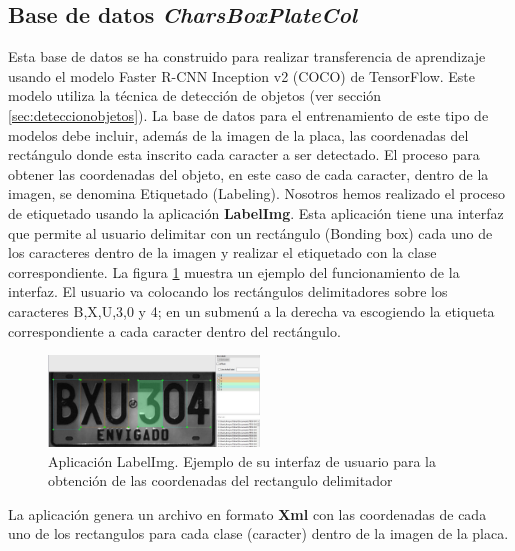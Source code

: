 \subsection{Base de datos \textit{CharsBoxPlateCol}} \label{sec:basedatos3}
Esta base de datos se ha construido para realizar transferencia de aprendizaje usando el modelo Faster R-CNN Inception v2 (COCO) de TensorFlow. Este modelo utiliza la técnica de detección de objetos (ver sección \ref{sec:deteccionobjetos}). La base de datos para el entrenamiento de este tipo de modelos debe incluir, además de la imagen de la placa, las coordenadas del rectángulo donde esta inscrito cada caracter a ser detectado. 
El proceso para obtener las coordenadas del objeto, en este caso de cada caracter, dentro de la imagen, se denomina Etiquetado (Labeling). Nosotros hemos realizado el proceso de etiquetado usando la aplicación \textbf{LabelImg}. Esta aplicación tiene una interfaz que permite al usuario delimitar con un rectángulo (Bonding box) cada uno de los caracteres dentro de la imagen y realizar el etiquetado con la clase correspondiente. La figura \ref{fig:etiquetas deteccion} muestra un ejemplo del funcionamiento de la interfaz. El usuario va colocando los rectángulos delimitadores sobre los caracteres B,X,U,3,0 y 4; en un submenú a la derecha  va escogiendo la etiqueta correspondiente a cada caracter dentro del rectángulo.   

\begin{figure}[H]
\centering
\includegraphics[width=0.5\textwidth]{imagenes/MODELO_5/ETIQUETA_MOD_IV.jpg} \caption{Aplicación LabelImg. Ejemplo de su interfaz de usuario para la obtención de las coordenadas del rectangulo delimitador}
\label{fig:etiquetas deteccion}
\end{figure}
 La aplicación genera un archivo en formato \textbf{Xml} con las coordenadas de cada uno de los rectangulos para cada clase (caracter) dentro de la imagen de la placa.  
 
